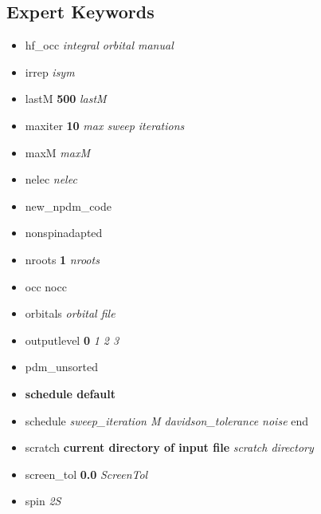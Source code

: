 \documentclass[letterpaper,10pt,english]{sphinxmanual}
\begin{document}
\subsection{Expert Keywords}
\label{keywords:expert-keywords}\begin{itemize}
\item {} 
hf\_occ \emph{integral \textbar{}\textbar{} orbital \textbar{}\textbar{} manual}

\item {} 
irrep \emph{isym}

\item {} 
lastM \textbf{500} \emph{\textbar{}\textbar{}  lastM}

\item {} 
maxiter \textbf{10} \emph{\textbar{}\textbar{} max sweep iterations}

\item {} 
maxM \emph{maxM}

\item {} 
nelec \emph{nelec}

\item {} 
new\_npdm\_code

\item {} 
nonspinadapted

\item {} 
nroots \textbf{1} \emph{\textbar{}\textbar{} nroots}

\item {} 
occ nocc

\item {} 
orbitals \emph{orbital file}

\item {} 
outputlevel \textbf{0} \emph{\textbar{}\textbar{} 1 \textbar{}\textbar{} 2 \textbar{}\textbar{} 3}

\item {} 
pdm\_unsorted

\item {} 
\textbf{schedule default}

\item {} 
schedule \emph{sweep\_iteration M davidson\_tolerance noise} end

\item {} 
scratch \textbf{current directory of input file} \emph{\textbar{}\textbar{} scratch directory}

\item {} 
screen\_tol \textbf{0.0} \emph{\textbar{}\textbar{} ScreenTol}

\item {} 
spin \emph{2S}


\end{itemize}
\end{document}
